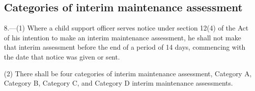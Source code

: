\documentclass[a4paper]{article}
\newcommand\amendment[1]{\subsubsection*{Notes}{\itshape\frenchspacing\footnotesize #1 \par}}
\begin{document}
%
%
%
%
%

\subsection[8. Categories of interim maintenance assessment]{Categories of interim maintenance assessment}

8.—(1) Where a child support officer serves notice under section 12(4) of the Act of his intention to make an interim maintenance assessment, he shall not make that interim assessment before the end of a period of 14 days, commencing with the date that notice was given or sent.

(2) There shall be four categories of interim maintenance assessment, Category A, Category B, Category C, and Category D interim maintenance assessments.
\end{document}
